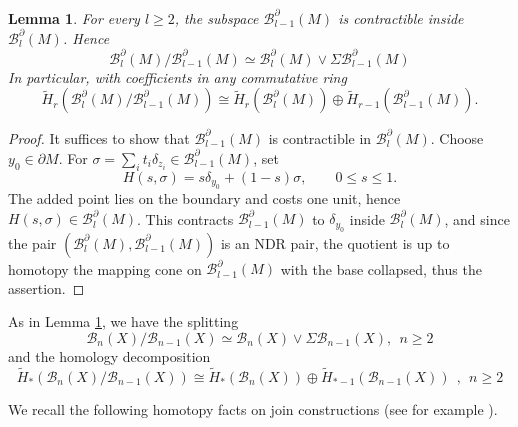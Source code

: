 \documentclass[11pt,a4paper]{article}
\numberwithin{equation}{section}
\newtheorem{lem}[thm]{Lemma}
\theoremstyle{definition}
\theoremstyle{remark}
\newcommand{\pa}{\partial}
\newcommand{\wt}{\widetilde}
\newcommand{\BB}{\mathcal B}
\begin{document}
\begin{lem}\label{lem:contractible-in-next}
For every \(l\ge 2\), the subspace \(\BB_{l-1}^{\pa}(M)\) is contractible inside \(\BB_l^{\pa}(M)\).  Hence
$$\BB_l^\pa (M)/\BB_{l-1}^\pa (M)\simeq\BB_{l}^\pa (M)\vee \Sigma \BB_{l-1}^\pa (M)$$
In particular, with coefficients in any commutative ring
\begin{equation*}
\wt H_r(\BB_l^{\pa}(M)/\BB_{l-1}^{\pa}(M))
\cong
\wt H_r(\BB_l^{\pa}(M))
\oplus
\wt H_{r-1}(\BB_{l-1}^{\pa}(M)).
\end{equation*}
\end{lem}

\begin{proof}
It suffices to show that $\BB_{l-1}^\pa (M)$ is contractible in $\BB_l^\pa (M)$.
Choose \(y_0\in\pa M\).  For \(\sigma=\sum_i t_i\delta_{z_i}\in \BB_{l-1}^{\pa}(M)\), set
\[
H(s,\sigma)=s\delta_{y_0}+(1-s)\sigma,
\qquad 0\le s\le1.
\]
The added point lies on the boundary and costs one unit, hence \(H(s,\sigma)\in \BB_l^{\pa}(M)\).  This contracts \(\BB_{l-1}^{\pa}(M)\) to \(\delta_{y_0}\) inside \(\BB_l^{\pa}(M)\), and since the pair $(\BB_l^\pa (M), \BB_{l-1}^\pa (M))$ is an NDR pair, the quotient is up to homotopy the mapping cone on $\BB_{l-1}^\pa (M)$ with the base collapsed, thus the assertion.
\end{proof}

As in Lemma \ref{lem:contractible-in-next}, we have the splitting
\begin{equation}\label{eq:bar-B-def-general}
\BB_n(X)/\BB_{n-1}(X)\simeq \BB_n(X)\vee \Sigma \BB_{n-1}(X),\ \ n\ge 2
\end{equation}
and the homology decomposition
\begin{equation*}
\wt H_*(\BB_n(X)/\BB_{n-1}(X))
\cong
\wt H_*(\BB_n(X))
\oplus
\wt H_{*-1}(\BB_{n-1}(X))\ \ ,\ \ n\geq 2
\end{equation*}

We recall the following homotopy facts on join constructions (see for example \cite{AKN2016}).
\end{document}
